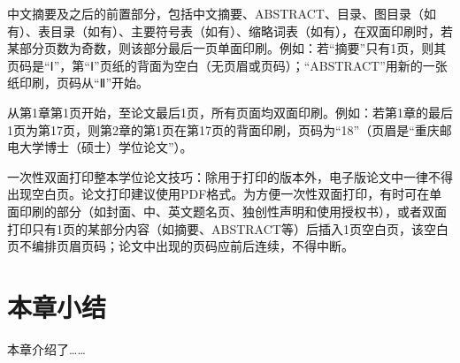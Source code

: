中文摘要及之后的前置部分，包括中文摘要、ABSTRACT、目录、图目录（如有）、表目录（如有）、主要符号表（如有）、缩略词表（如有），在双面印刷时，若某部分页数为奇数，则该部分最后一页单面印刷。例如：若“摘要”只有1页，则其页码是“Ⅰ”，第“Ⅰ”页纸的背面为空白（无页眉或页码）；“ABSTRACT”用新的一张纸印刷，页码从“Ⅱ”开始。

从第1章第1页开始，至论文最后1页，所有页面均双面印刷。例如：若第1章的最后1页为第17页，则第2章的第1页在第17页的背面印刷，页码为“18”（页眉是“重庆邮电大学博士（硕士）学位论文”）。

一次性双面打印整本学位论文技巧：除用于打印的版本外，电子版论文中一律不得出现空白页。论文打印建议使用PDF格式。为方便一次性双面打印，有时可在单面印刷的部分（如封面、中、英文题名页、独创性声明和使用授权书），或者双面打印只有1页的某部分内容（如摘要、ABSTRACT等）后插入1页空白页，该空白页不编排页眉页码；论文中出现的页码应前后连续，不得中断。


\section{本章小结}
本章介绍了……



